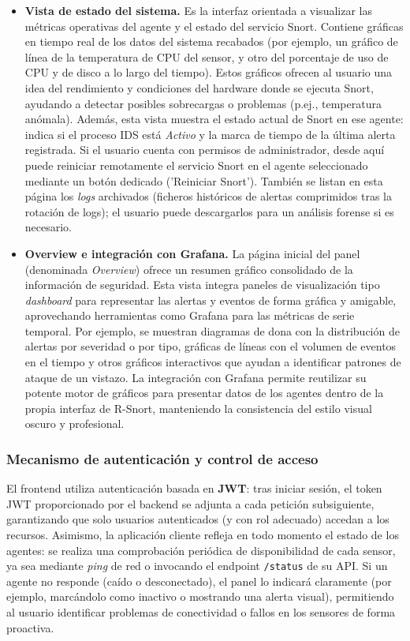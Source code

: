 \documentclass[11pt,a4paper,twoside]{report}
\begin{document}
\begin{itemize}
	\item \textbf{Vista de estado del sistema.} Es la interfaz orientada a visualizar las métricas operativas del agente y el estado del servicio Snort. Contiene gráficas en tiempo real de los datos del sistema recabados (por ejemplo, un gráfico de línea de la temperatura de CPU del sensor, y otro del porcentaje de uso de CPU y de disco a lo largo del tiempo). Estos gráficos ofrecen al usuario una idea del rendimiento y condiciones del hardware donde se ejecuta Snort, ayudando a detectar posibles sobrecargas o problemas (p.ej., temperatura anómala). Además, esta vista muestra el estado actual de Snort en ese agente: indica si el proceso IDS está \emph{Activo} y la marca de tiempo de la última alerta registrada. Si el usuario cuenta con permisos de administrador, desde aquí puede reiniciar remotamente el servicio Snort en el agente seleccionado mediante un botón dedicado ('Reiniciar Snort'). También se listan en esta página los \emph{logs} archivados (ficheros históricos de alertas comprimidos tras la rotación de logs); el usuario puede descargarlos para un análisis forense si es necesario.
	
	\item \textbf{Overview e integración con Grafana.} La página inicial del panel (denominada \emph{Overview}) ofrece un resumen gráfico consolidado de la información de seguridad. Esta vista integra paneles de visualización tipo \emph{dashboard} para representar las alertas y eventos de forma gráfica y amigable, aprovechando herramientas como Grafana para las métricas de serie temporal. Por ejemplo, se muestran diagramas de dona con la distribución de alertas por severidad o por tipo, gráficas de líneas con el volumen de eventos en el tiempo y otros gráficos interactivos que ayudan a identificar patrones de ataque de un vistazo. La integración con Grafana permite reutilizar su potente motor de gráficos para presentar datos de los agentes dentro de la propia interfaz de R-Snort, manteniendo la consistencia del estilo visual oscuro y profesional.
\end{itemize}

\subsubsection{Mecanismo de autenticación y control de acceso}

El frontend utiliza autenticación basada en \textbf{JWT}: tras iniciar sesión, el token JWT proporcionado por el backend se adjunta a cada petición subsiguiente, garantizando que solo usuarios autenticados (y con rol adecuado) accedan a los recursos. Asimismo, la aplicación cliente refleja en todo momento el estado de los agentes: se realiza una comprobación periódica de disponibilidad de cada sensor, ya sea mediante \emph{ping} de red o invocando el endpoint \texttt{/status} de su API. Si un agente no responde (caído o desconectado), el panel lo indicará claramente (por ejemplo, marcándolo como inactivo o mostrando una alerta visual), permitiendo al usuario identificar problemas de conectividad o fallos en los sensores de forma proactiva.
\end{document}
